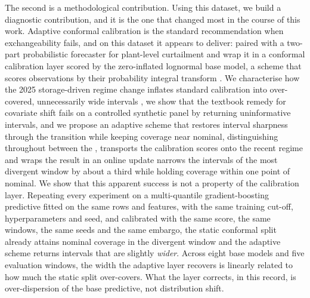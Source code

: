 \documentclass[preprint,3p,times]{elsarticle}
\providecommand{\DIFaddtex}[1]{{\protect\color{blue} \sf #1}} %
\providecommand{\DIFdeltex}[1]{{\protect\color{red} \scriptsize #1}} %
\providecommand{\DIFaddbegin}{} %
\providecommand{\DIFaddend}{} %
\providecommand{\DIFdelbegin}{} %
\providecommand{\DIFdelend}{} %
\providecommand{\DIFadd}[1]{\texorpdfstring{\DIFaddtex{#1}}{#1}} %
\providecommand{\DIFdel}[1]{\texorpdfstring{\DIFdeltex{#1}}{}} %
\begin{document}
\DIFaddend The second is a \DIFdelbegin \DIFdel{methodological contribution. Using this dataset, we build a }\DIFdelend \DIFaddbegin \DIFadd{diagnostic contribution, and it is the one that changed most in the course of this work. Adaptive conformal calibration is the standard recommendation when exchangeability fails, and on this dataset it appears to deliver: paired with a }\DIFaddend two-part \DIFdelbegin \DIFdel{probabilistic forecaster for plant-level curtailment and wrap it in a conformal calibration layer scored by the }\DIFdelend \DIFaddbegin \DIFadd{zero-inflated lognormal base model, a scheme that scores observations by their }\DIFaddend probability integral transform\DIFdelbegin \DIFdel{. We characterise how the 2025 storage-driven regime change inflates standard calibration into over-covered, unnecessarily wide intervals , we show that the textbook remedy for covariate shift fails on a controlled synthetic panel by returning uninformative intervals, and we propose an adaptive scheme that restores interval sharpness through the transition while keeping coverage near nominal, distinguishing throughout between the }\DIFdelend \DIFaddbegin \DIFadd{, transports the calibration scores onto the recent regime and wraps the result in an online update narrows the intervals of the most divergent window by about a third while holding coverage within one point of nominal. We show that this apparent success is not a property of the calibration layer. Repeating every experiment on a multi-quantile gradient-boosting predictive fitted on the same rows and features, with the same training cut-off, hyperparameters and seed, and calibrated with the same score, the same windows, the same seeds and the same embargo, the static conformal split already attains nominal coverage in the divergent window and the adaptive scheme returns intervals that are slightly \emph{wider}. Across eight base models and five evaluation windows, the width the adaptive layer recovers is linearly related to how much the static split over-covers. What the layer corrects, in this record, is over-dispersion of the base predictive, not distribution shift.
}
\end{document}
